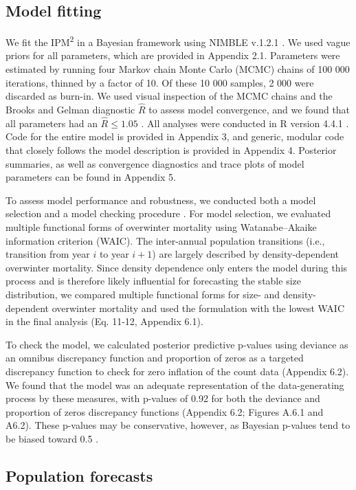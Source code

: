 \documentclass{article}
\begin{document}
\subsection{Model fitting}
We fit the IPM\textsuperscript{2} in a Bayesian framework using NIMBLE v.1.2.1 \parencite{de2017programming}. We used vague priors for all parameters, which are provided in Appendix 2.1. Parameters were estimated by running four Markov chain Monte Carlo (MCMC) chains of 100 000 iterations, thinned by a factor of 10. Of these 10 000 samples, 2 000 were discarded as burn-in. We used visual inspection of the MCMC chains and the Brooks and Gelman diagnostic $\hat{R}$ to assess model convergence, and we found that all parameters had an $\hat{R} \leq 1.05$ \parencite{brooks1998general}. All analyses were conducted in R version 4.4.1 \parencite{Rcore}. Code for the entire model is provided in Appendix 3, and generic, modular code that closely follows the model description is provided in Appendix 4. Posterior summaries, as well as convergence diagnostics and trace plots of model parameters can be found in Appendix 5.

To assess model performance and robustness, we conducted both a model selection and a model checking procedure \parencite{conn2018guide}. For model selection, we evaluated multiple functional forms of overwinter mortality using Watanabe–Akaike information criterion (WAIC). The inter-annual population transitions (i.e., transition from year $i$ to year $i + 1$) are largely described by density-dependent overwinter mortality. Since density dependence only enters the model during this process and is therefore likely influential for forecasting the stable size distribution, we compared multiple functional forms for size- and density-dependent overwinter mortality and used the formulation with the lowest WAIC in the final analysis (Eq. 11-12, Appendix 6.1).

To check the model, we calculated posterior predictive p-values using deviance as an omnibus discrepancy function and proportion of zeros as a targeted discrepancy function to check for zero inflation of the count data (Appendix 6.2). We found that the model was an adequate representation of the data-generating process by these measures, with p-values of 0.92 for both the deviance and proportion of zeros discrepancy functions (Appendix 6.2; Figures A.6.1 and A6.2). These p-values may be conservative, however, as Bayesian p-values tend to be biased toward 0.5 \parencite{conn2018guide}.


\subsection{Population forecasts}
\end{document}
